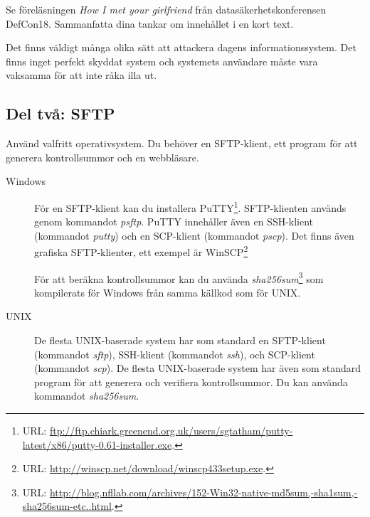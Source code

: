 \documentclass[11pt,a4paper]{miunasgn}
\begin{document}
\begin{questions}

	\question\label{q:Kamkar}
	Se föreläsningen \emph{How I met your girlfriend} \citep{Kamkar2010him}
	från datasäkerhetskonferensen DefCon18.
	Sammanfatta dina tankar om innehållet i en kort text.
	\begin{solution}
		Det finns väldigt många olika sätt att attackera dagens
		informationssystem.
		Det finns inget perfekt skyddat system och systemets användare måste
		vara vaksamma för att inte råka illa ut.
	\end{solution}

\end{questions}

\subsection{Del två: SFTP}
\noindent
Använd valfritt operativsystem.
Du behöver en SFTP-klient, ett program för att generera kontrollsummor och en
webbläsare.
\begin{description}
	\item[Windows] För en SFTP-klient kan du installera PuTTY\footnote{%
			URL: \url{ftp://ftp.chiark.greenend.org.uk/users/sgtatham/putty-latest/x86/putty-0.61-installer.exe}.
		}.
		SFTP-klienten används genom kommandot \emph{psftp}.
		PuTTY innehåller även en SSH-klient (kommandot \emph{putty}) och en
		SCP-klient (kommandot \emph{pscp}).
		Det finns även grafiska SFTP-klienter, ett exempel är WinSCP\footnote{%
			URL: \url{http://winscp.net/download/winscp433setup.exe}.
		}

		För att beräkna kontrollsummor kan du använda
		\emph{sha256sum}\footnote{%
			URL: \url{http://blog.nfllab.com/archives/152-Win32-native-md5sum,-sha1sum,-sha256sum-etc..html}.
		} som kompilerats för Windows från samma källkod som för UNIX.
	\item[UNIX] De flesta UNIX-baserade system har som standard en SFTP-klient
		(kommandot \emph{sftp}), SSH-klient (kommandot \emph{ssh}), och
		SCP-klient (kommandot \emph{scp}).
		De flesta UNIX-baserade system har även som standard program för att
		generera och verifiera kontrollsummor.
		Du kan använda kommandot \emph{sha256sum}.
\end{description}
\end{document}
